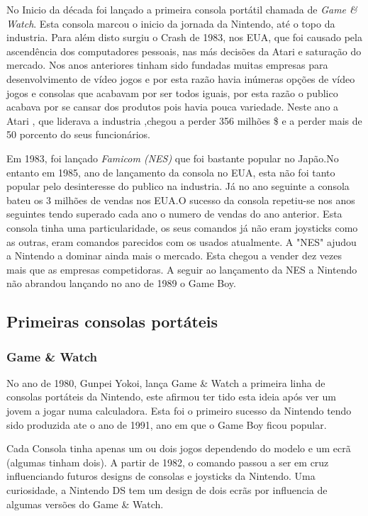 \documentclass{report}
\begin{document}
No Inicio da década foi lançado a primeira consola portátil chamada de \textit{Game \& Watch}. Esta consola marcou o inicio da jornada da Nintendo, até o topo da industria.
Para além disto surgiu o Crash de 1983, nos EUA, que foi causado pela ascendência dos computadores pessoais, nas más decisões da Atari e saturação do mercado. Nos anos anteriores tinham sido fundadas muitas empresas para desenvolvimento de vídeo jogos e por esta razão havia inúmeras opções de vídeo jogos e consolas que acabavam por ser todos iguais, por esta razão o publico acabava por se cansar dos produtos pois havia pouca variedade. Neste ano a Atari , que liderava a industria ,chegou a perder 356 milhões \$ e a perder mais de 50 porcento do seus funcionários.

Em 1983, foi lançado \textit{Famicom (NES)} que foi bastante popular no Japão.No entanto em 1985, ano de lançamento da consola no EUA, esta não foi tanto popular pelo desinteresse do publico na industria. Já no ano seguinte a consola bateu os 3 milhões de vendas nos EUA.O sucesso da consola repetiu-se nos anos seguintes tendo superado cada ano o numero de vendas do ano anterior. Esta consola tinha uma particularidade, os seus comandos já não eram joysticks como as outras, eram comandos parecidos com os usados atualmente. A "NES" ajudou a Nintendo a dominar ainda mais o mercado. Esta chegou a vender dez vezes mais que as empresas competidoras. A seguir ao lançamento da NES a Nintendo não abrandou lançando no ano de 1989 o Game Boy.


\subsection{Primeiras consolas portáteis}
\label{subsec.Primeiras consolas portáteis}
\subsubsection{Game \& Watch}
\label{subsubsec.Game & Watch}
 No ano de 1980, Gunpei Yokoi, lança Game \& Watch a primeira linha de consolas portáteis da Nintendo, este afirmou ter tido esta ideia após ver um jovem a jogar numa calculadora. Esta foi o primeiro sucesso da Nintendo tendo sido produzida ate o ano de 1991, ano em que o Game Boy ficou popular.
 
 Cada Consola tinha apenas um ou dois jogos dependendo do modelo e um ecrã (algumas tinham dois). A partir de 1982, o comando passou a ser em cruz influenciando futuros designs de consolas e joysticks da Nintendo. 
 Uma curiosidade, a Nintendo DS tem um design de dois ecrãs por influencia de algumas versões do Game \& Watch.\\
 
\end{document}
